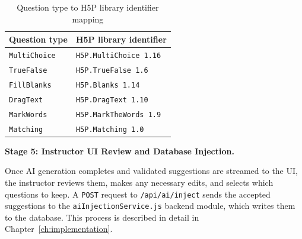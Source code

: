 \begin{table}[H]
  \centering
  \begin{tabular}{ll}
    \toprule
    \textbf{Question type} & \textbf{H5P library identifier} \\
    \midrule
    \texttt{MultiChoice} & \texttt{H5P.MultiChoice 1.16} \\
    \texttt{TrueFalse}   & \texttt{H5P.TrueFalse 1.6}   \\
    \texttt{FillBlanks}  & \texttt{H5P.Blanks 1.14}     \\
    \texttt{DragText}    & \texttt{H5P.DragText 1.10}   \\
    \texttt{MarkWords}   & \texttt{H5P.MarkTheWords 1.9}\\
    \texttt{Matching}    & \texttt{H5P.Matching 1.0}    \\
    \bottomrule
  \end{tabular}
  \caption{Question type to H5P library identifier mapping}
  \label{tab:h5p_type_map}
\end{table}

\textbf{Stage 5: Instructor UI Review and Database Injection.}

Once AI generation completes and validated suggestions are streamed to the UI, the instructor reviews them, makes any necessary edits, and selects which questions to keep. A \texttt{POST} request to \texttt{/api/ai/inject} sends the accepted suggestions to the \texttt{aiInjectionService.js} backend module, which writes them to the database. This process is described in detail in Chapter~\ref{ch:implementation}.
